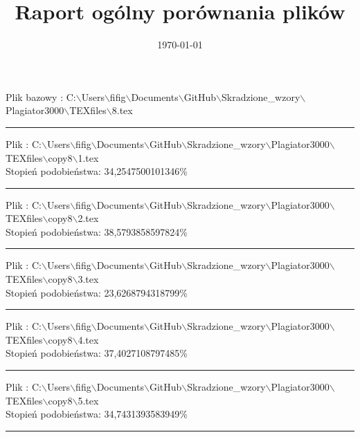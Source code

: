 \documentclass{article}
\begin{document}
\title{\huge\bfseries Raport ogólny porównania plików }
\date{\today}
\maketitle
\begin{flushleft}
Plik bazowy : C:$\backslash$Users$\backslash$fifig$\backslash$Documents$\backslash$GitHub$\backslash$Skradzione\_wzory$\backslash$Plagiator3000$\backslash$TEXfiles$\backslash$8.tex
\end{flushleft}
\hrule
\begin{flushleft}
Plik : C:$\backslash$Users$\backslash$fifig$\backslash$Documents$\backslash$GitHub$\backslash$Skradzione\_wzory$\backslash$Plagiator3000$\backslash$TEXfiles$\backslash$copy8$\backslash$1.tex\\
{\huge Stopień podobieństwa: 34,2547500101346\%} \\ 

\end{flushleft}
\hrule
\begin{flushleft}
Plik : C:$\backslash$Users$\backslash$fifig$\backslash$Documents$\backslash$GitHub$\backslash$Skradzione\_wzory$\backslash$Plagiator3000$\backslash$TEXfiles$\backslash$copy8$\backslash$2.tex\\
{\huge Stopień podobieństwa: 38,5793858597824\%} \\ 

\end{flushleft}
\hrule
\begin{flushleft}
Plik : C:$\backslash$Users$\backslash$fifig$\backslash$Documents$\backslash$GitHub$\backslash$Skradzione\_wzory$\backslash$Plagiator3000$\backslash$TEXfiles$\backslash$copy8$\backslash$3.tex\\
{\huge Stopień podobieństwa: 23,6268794318799\%} \\ 

\end{flushleft}
\hrule
\begin{flushleft}
Plik : C:$\backslash$Users$\backslash$fifig$\backslash$Documents$\backslash$GitHub$\backslash$Skradzione\_wzory$\backslash$Plagiator3000$\backslash$TEXfiles$\backslash$copy8$\backslash$4.tex\\
{\huge Stopień podobieństwa: 37,4027108797485\%} \\ 

\end{flushleft}
\hrule
\begin{flushleft}
Plik : C:$\backslash$Users$\backslash$fifig$\backslash$Documents$\backslash$GitHub$\backslash$Skradzione\_wzory$\backslash$Plagiator3000$\backslash$TEXfiles$\backslash$copy8$\backslash$5.tex\\
{\huge Stopień podobieństwa: 34,7431393583949\%} \\ 

\end{flushleft}
\hrule
\end{document}

